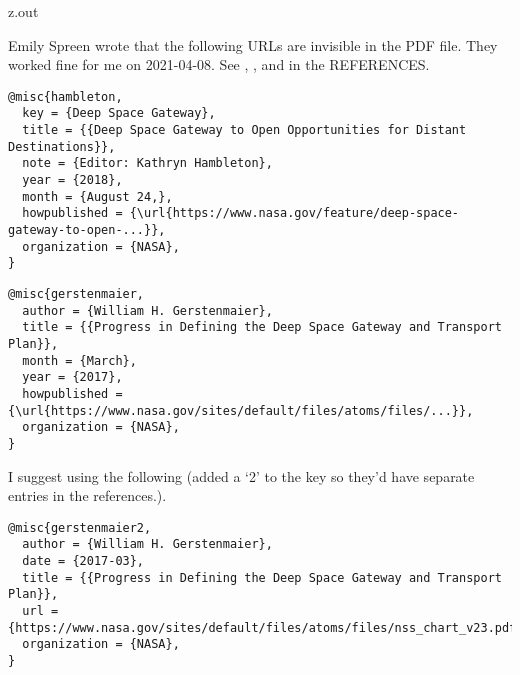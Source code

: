 \begin{VerbatimOut}{z.out}

Emily Spreen wrote that the following URLs are invisible in the PDF file.
They worked fine for me on 2021-04-08.
See \cite{hambleton}, \cite{gerstenmaier}, and \cite{gerstenmaier2} in the REFERENCES.

{\footnotesize
\begin{verbatim}
@misc{hambleton,
  key = {Deep Space Gateway},
  title = {{Deep Space Gateway to Open Opportunities for Distant Destinations}},
  note = {Editor: Kathryn Hambleton},
  year = {2018},
  month = {August 24,},
  howpublished = {\url{https://www.nasa.gov/feature/deep-space-gateway-to-open-...}},
  organization = {NASA},
}
\end{verbatim}
}

{\footnotesize
\begin{verbatim}
@misc{gerstenmaier,
  author = {William H. Gerstenmaier},
  title = {{Progress in Defining the Deep Space Gateway and Transport Plan}},
  month = {March},
  year = {2017},
  howpublished = {\url{https://www.nasa.gov/sites/default/files/atoms/files/...}},
  organization = {NASA},
}
\end{verbatim}
}

I suggest using the following
(added a `2' to the key so they'd have separate entries in the references.).
{\footnotesize
\begin{verbatim}
@misc{gerstenmaier2,
  author = {William H. Gerstenmaier},
  date = {2017-03},
  title = {{Progress in Defining the Deep Space Gateway and Transport Plan}},
  url = {https://www.nasa.gov/sites/default/files/atoms/files/nss_chart_v23.pdf},
  organization = {NASA},
}
\end{verbatim}
}
\end{VerbatimOut}


\MyIO
